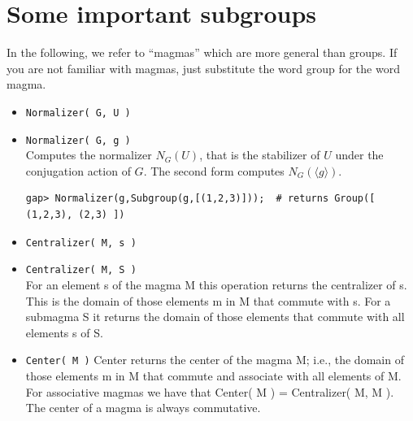 \documentclass[11pt]{amsart}
\theoremstyle{plain}
\newcommand{\codesize}{\footnotesize}
\newcommand{\<}{\ensuremath{\langle}}
\renewcommand{\>}{\ensuremath{\rangle}}
\begin{document}
\section{Some important subgroups}
In the following, we refer to ``magmas'' which
  are more general than groups.  If you are not familiar with magmas, just substitute
  the word group for the word magma.
  \begin{itemize}
\item {\tt Normalizer( G, U )}
\item {\tt Normalizer( G, g )}\\[2pt]
Computes the normalizer $N_G(U)$, that is the stabilizer of $U$ under the conjugation
action of $G$. The second form computes $N_G(\langle g \rangle)$.
{\codesize
\begin{verbatim}
gap> Normalizer(g,Subgroup(g,[(1,2,3)]));  # returns Group([ (1,2,3), (2,3) ])
\end{verbatim}}
\item {\tt Centralizer( M, s )}
\item {\tt Centralizer( M, S )}\\[2pt]
For an element s of the magma M this operation returns the centralizer of s. 
This is the domain of those elements m in M that commute with s.
For a submagma S it returns the domain of those elements that commute with all elements s of S.
\item {\tt Center( M )}
Center returns the center of the magma M; i.e., the domain of those elements m in M that commute and
associate with all elements of M. 
For associative magmas we have that Center( M ) = Centralizer( M, M ).
The center of a magma is always commutative.


\end{itemize}
\end{document}
